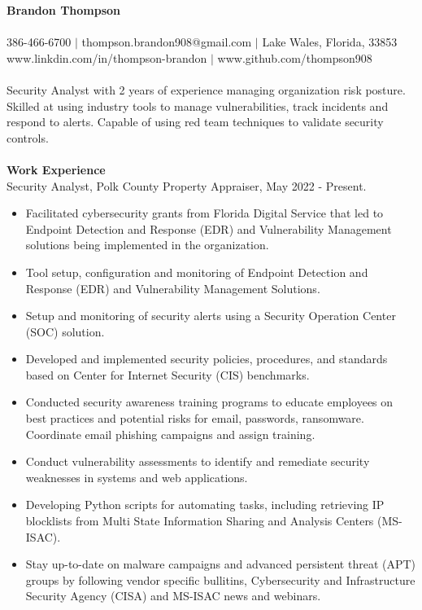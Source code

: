 \documentclass[12pt,a4paper]{article}
\begin{document}
{\centering\textbf{Brandon Thompson}}\\
\\
386-466-6700 $|$ thompson.brandon908@gmail.com $|$ Lake Wales, Florida, 33853\\ %
www.linkdin.com/in/thompson-brandon $|$ www.github.com/thompson908
\\
\\
Security Analyst with 2 years of experience managing organization risk posture. Skilled at using industry tools to manage vulnerabilities, track incidents and respond to alerts. Capable of using red team techniques to validate security controls.
\\
\\
\textbf{Work Experience}\\
Security Analyst, Polk County Property Appraiser, May 2022 - Present.
\begin{itemize}
    \item Facilitated cybersecurity grants from Florida Digital Service that led to Endpoint Detection and Response (EDR) and Vulnerability Management solutions being implemented in the organization. 
    \item Tool setup, configuration and monitoring of Endpoint Detection and Response (EDR) and Vulnerability Management Solutions.
    \item Setup and monitoring of security alerts using a Security Operation Center (SOC) solution.
    \item Developed and implemented security policies, procedures, and standards based on Center for Internet Security (CIS) benchmarks.
    \item Conducted security awareness training programs to educate employees on best practices and potential risks for email, passwords, ransomware. Coordinate email phishing campaigns and assign training.
    \item Conduct vulnerability assessments to identify and remediate security weaknesses in systems and web applications. %
    \item Developing Python scripts for automating tasks, including retrieving IP blocklists from Multi State Information Sharing and Analysis Centers (MS-ISAC).
    \item Stay up-to-date on malware campaigns and advanced persistent threat (APT) groups by following vendor specific bullitins, Cybersecurity and Infrastructure Security Agency (CISA) and MS-ISAC news and webinars.
\end{itemize}
\end{document}
